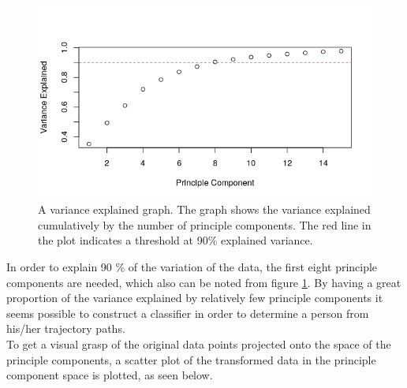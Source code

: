 \documentclass[11pt, fleqn, titlepage]{article}
\begin{document}
\begin{figure}[H]
	\centering
	\includegraphics[width=0.7\linewidth]{billeder/varexp.png}
	\caption{A variance explained graph. The graph shows the variance explained cumulatively by the number of principle components. The red line in the plot indicates a threshold at 90\% explained variance.}
	\label{fig:varexp}
\end{figure}

In order to explain 90 \% of the variation of the data, the first eight principle components are needed, which also can be noted from figure \ref{fig:varexp}. By having a great proportion of the variance explained by relatively few principle components it seems possible to construct a classifier in order to determine a person from his/her trajectory paths.
\\
To get a visual grasp of the original data points projected onto the space of the principle components, a scatter plot of the transformed data in the principle component space is plotted, as seen below.
\end{document}
